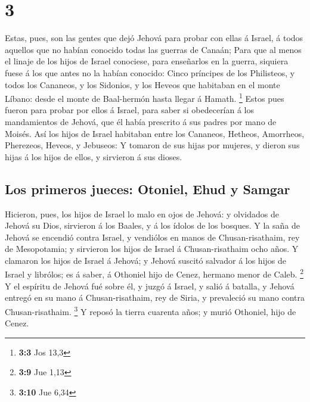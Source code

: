 \hypertarget{section-2}{%
\section{3}\label{section-2}}

 Estas, pues, son las gentes que dejó Jehová para probar con
ellas á Israel, á todos aquellos que no habían conocido todas las
guerras de Canaán;  Para que al menos el linaje de los hijos
de Israel conociese, para enseñarlos en la guerra, siquiera fuese á los
que antes no la habían conocido:  Cinco príncipes de los
Philisteos, y todos los Cananeos, y los Sidonios, y los Heveos que
habitaban en el monte Líbano: desde el monte de Baal-hermón hasta llegar
á Hamath. \footnote{\textbf{3:3} Jos 13,3}  Estos pues
fueron para probar por ellos á Israel, para saber si obedecerían á los
mandamientos de Jehová, que él había prescrito á sus padres por mano de
Moisés.  Así los hijos de Israel habitaban entre los
Cananeos, Hetheos, Amorrheos, Pherezeos, Heveos, y Jebuseos:
 Y tomaron de sus hijas por mujeres, y dieron sus hijas á
los hijos de ellos, y sirvieron á sus dioses.

\hypertarget{los-primeros-jueces-otoniel-ehud-y-samgar}{%
\subsection{Los primeros jueces: Otoniel, Ehud y
Samgar}\label{los-primeros-jueces-otoniel-ehud-y-samgar}}

 Hicieron, pues, los hijos de Israel lo malo en ojos de
Jehová: y olvidados de Jehová su Dios, sirvieron á los Baales, y á los
ídolos de los bosques.  Y la saña de Jehová se encendió
contra Israel, y vendiólos en manos de Chusan-risathaim, rey de
Mesopotamia; y sirvieron los hijos de Israel á Chusan-risathaim ocho
años.  Y clamaron los hijos de Israel á Jehová; y Jehová
suscitó salvador á los hijos de Israel y librólos; es á saber, á
Othoniel hijo de Cenez, hermano menor de Caleb. \footnote{\textbf{3:9}
  Jue 1,13}  Y el espíritu de Jehová fué sobre él, y juzgó
á Israel, y salió á batalla, y Jehová entregó en su mano á
Chusan-risathaim, rey de Siria, y prevaleció su mano contra
Chusan-risathaim. \footnote{\textbf{3:10} Jue 6,34}  Y
reposó la tierra cuarenta años; y murió Othoniel, hijo de Cenez.

